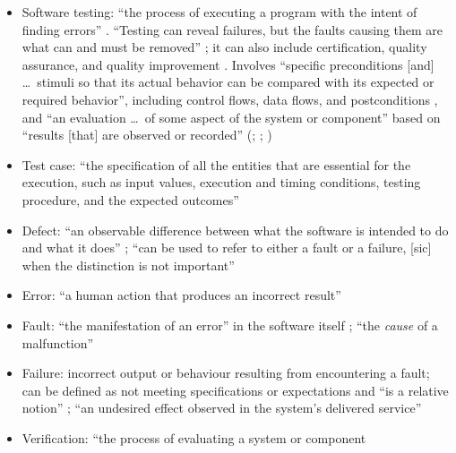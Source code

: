 \begin{itemize}
    \item Software testing: ``the process of executing a program with the
          intent of finding errors'' \citep[p.~438]{PetersAndPedrycz2000}
          . ``Testing can reveal
          failures, but the faults causing them are what can and must be
          removed'' \citep[p.~5-3]{SWEBOK2024}; it can also include
          certification, quality assurance, and quality improvement
          \citep[p.~5-4]{SWEBOK2024}. Involves ``specific preconditions
              [and] \dots\ stimuli so that its actual behavior can be
          compared with its expected or required behavior'', including
          control flows, data flows, and postconditions
          \citep[p.~11]{Firesmith2015}, and ``an evaluation \dots\ of some
          aspect of the system or component'' based on ``results [that]
          are observed or recorded'' (\citealp[p.~10]{IEEE2022};
          \citeyear[p.~6]{IEEE2021}; \citeyear[p.~465]{IEEE2017}
          )
    \item Test case: ``the specification of all the entities
          that are essential for the execution, such as input values,
          execution and timing conditions, testing procedure, and the
          expected outcomes'' \citep[pp.~5-1 to 5-2]{SWEBOK2024}
    \item Defect: ``an observable difference between what the software is
          intended to do and what it does'' \citep[p.~1-1]{SWEBOK2024}; ``can
          be used to refer to either a fault or a failure, [sic] when the
          distinction is not important'' \citep[p.~4-3]{SWEBOK2014}
    \item Error: ``a human action that produces an incorrect result''
          \citep[p.~399]{vanVliet2000}
    \item Fault: ``the manifestation of an error'' in the software itself
          \citep[p.~400]{vanVliet2000}; ``the \emph{cause} of a malfunction''
          \citep[p.~5-3]{SWEBOK2024}
    \item Failure: incorrect output or behaviour resulting from encountering
          a fault; can be defined as not meeting specifications or
          expectations and ``is a relative notion''
          \citep[p.~400]{vanVliet2000}; ``an undesired effect observed in the
          system's delivered service'' \citep[p.~5-3]{SWEBOK2024}
    \item Verification: ``the process of evaluating a system or component

\end{itemize}
